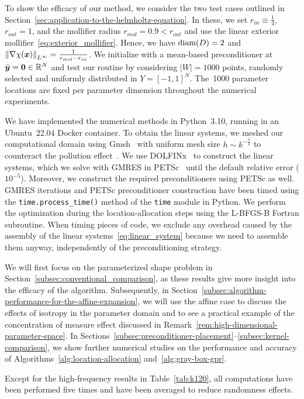 To show the efficacy of our method, we consider the two test cases outlined in Section~\ref{sec:application-to-the-helmholtz-equation}.
In these, we set $r_{in}\equiv\frac{1}{4}$, $r_{out}=1$, and the mollifier radius $r_{mol}=0.9 < r_{out}$ and use the linear exterior mollifier~\eqref{eq:exterior_mollifier}.
Hence, we have $\operatorname*{diam}(D)=2$ and $\left\| \nabla \chi({{\bm{x}}}) \right\|_{L^{\infty}}=\frac{1}{r_{mol} - r_{in}}$.
We initialize with a mean-based preconditioner at $\bar{\bm{y}}=\bm{0}\in\mathbb{R}^N$ and test our routine by considering $|W|=1000$ points, randomly selected and uniformly distributed in $Y=[-1,1]^N$.
The~1000 parameter locations are fixed per parameter dimension throughout the numerical experiments.

We have implemented the numerical methods in Python~3.10, running in an Ubuntu~$22.04$ Docker container.
To obtain the linear systems, we meshed our computational domain using Gmsh~\cite{geuzaine2009} with uniform mesh size $h\sim k^{-\frac{3}{2}}$ to counteract the pollution effect~\cite{babuska1997}.
We use DOLFINx~\cite{alnaes2014a,baratta2023,scroggs2022,scroggs2022a} to construct the linear systems, which we solve with GMRES in PETSc~\cite{brown2022} until the default relative error ($10^{-5}$).
Moreover, we construct the required preconditioners using PETSc as well.
GMRES iterations and PETSc preconditioner construction have been timed using the \texttt{time.process\_time()} method of the \texttt{time} module in Python.
We perform the optimization during the location-allocation steps using the L-BFGS-B Fortran subroutine.
When timing pieces of code, we exclude any overhead caused by the assembly of the linear systems~\eqref{eq:linear_system} because we need to assemble them anyway, independently of the preconditioning strategy.

We will first focus on the parameterized shape problem in Section~\ref{subsec:conventional_comparison}, as these results give more insight into the efficacy of the algorithm.
Subsequently, in Section~\ref{subsec:algorithm-performance-for-the-affine-expansion}, we will use the affine case to discuss the effects of isotropy in the parameter domain and to see a practical example of the concentration of measure effect discussed in Remark~\ref{rem:high-dimensional-parameter-space}.
In Sections~\ref{subsec:preconditioner-placement}--\ref{subsec:kernel-comparison}, we show further numerical studies on the performance and accuracy of Algorithms~\ref{alg:location-allocation} and~\ref{alg:gray-box-gpr}.

Except for the high-frequency results in Table~\ref{tab:k120}, all computations have been performed five times and have been averaged to reduce randomness effects.

